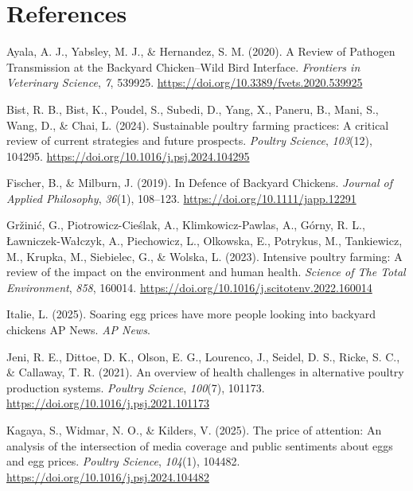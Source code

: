 \documentclass[
  man,
  floatsintext,
  longtable,
  nolmodern,
  notxfonts,
  notimes,
  colorlinks=true,linkcolor=blue,citecolor=blue,urlcolor=blue]{apa7}
\newlength{\cslhangindent}
\newenvironment{CSLReferences}[2] %
 {\begin{list}{}{%
  \setlength{\itemindent}{0pt}
  \setlength{\leftmargin}{0pt}
  \setlength{\parsep}{0pt}
  \ifodd #1
   \setlength{\leftmargin}{\cslhangindent}
   \setlength{\itemindent}{-1\cslhangindent}
  \fi
  \setlength{\itemsep}{#2\baselineskip}}}
 {\end{list}}
\begin{document}
\section{References}\label{references}

\label{refs}
\begin{CSLReferences}{1}{0}
Ayala, A. J., Yabsley, M. J., \& Hernandez, S. M. (2020). A {Review} of
{Pathogen Transmission} at the {Backyard Chicken}--{Wild Bird
Interface}. \emph{Frontiers in Veterinary Science}, \emph{7}, 539925.
\url{https://doi.org/10.3389/fvets.2020.539925}

Bist, R. B., Bist, K., Poudel, S., Subedi, D., Yang, X., Paneru, B.,
Mani, S., Wang, D., \& Chai, L. (2024). Sustainable poultry farming
practices: A critical review of current strategies and future prospects.
\emph{Poultry Science}, \emph{103}(12), 104295.
\url{https://doi.org/10.1016/j.psj.2024.104295}

Fischer, B., \& Milburn, J. (2019). In {Defence} of {Backyard Chickens}.
\emph{Journal of Applied Philosophy}, \emph{36}(1), 108--123.
\url{https://doi.org/10.1111/japp.12291}

Gržinić, G., Piotrowicz-Cieślak, A., Klimkowicz-Pawlas, A., Górny, R.
L., Ławniczek-Wałczyk, A., Piechowicz, L., Olkowska, E., Potrykus, M.,
Tankiewicz, M., Krupka, M., Siebielec, G., \& Wolska, L. (2023).
Intensive poultry farming: {A} review of the impact on the environment
and human health. \emph{Science of The Total Environment}, \emph{858},
160014. \url{https://doi.org/10.1016/j.scitotenv.2022.160014}

Italie, L. (2025). Soaring egg prices have more people looking into
backyard chickens {\textbar} {AP News}. \emph{AP News}.

Jeni, R. E., Dittoe, D. K., Olson, E. G., Lourenco, J., Seidel, D. S.,
Ricke, S. C., \& Callaway, T. R. (2021). An overview of health
challenges in alternative poultry production systems. \emph{Poultry
Science}, \emph{100}(7), 101173.
\url{https://doi.org/10.1016/j.psj.2021.101173}

Kagaya, S., Widmar, N. O., \& Kilders, V. (2025). The price of
attention: {An} analysis of the intersection of media coverage and
public sentiments about eggs and egg prices. \emph{Poultry Science},
\emph{104}(1), 104482. \url{https://doi.org/10.1016/j.psj.2024.104482}


\end{CSLReferences}
\end{document}
